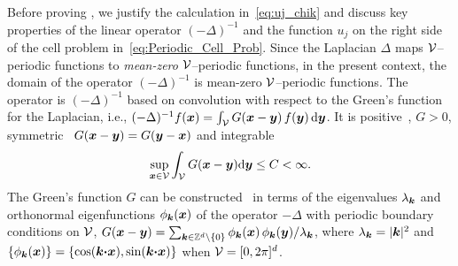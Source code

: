 \documentclass[amsa]{ipart}
\begin{document}
Before proving , we justify the calculation 
in~\eqref{eq:uj_chik} and discuss key properties of the
linear operator $(-\Delta)^{-1}$ and the function $u_j$ on the right side
of the cell problem in~\eqref{eq:Periodic_Cell_Prob}. Since the
Laplacian $\Delta$ maps $\mathcal{V}$--periodic functions to \emph{mean-zero}
$\mathcal{V}$--periodic functions, in the present context, the domain of the
operator $(-\Delta)^{-1}$ is mean-zero $\mathcal{V}$--periodic functions. The
operator is $(-\Delta)^{-1}$ based on convolution with respect to the
Green's function for the Laplacian, i.e.,
$(-\Delta)^{-1}f(\boldsymbol{x})=\int_{\mathcal{V}}G(\boldsymbol{x}-\boldsymbol{y})\,f(\boldsymbol{y})\,\mathrm{d}\boldsymbol{y}$. It is
positive~\cite{Stakgold:BVP:2000}, $G>0$,
symmetric~\cite{Folland:95:PDEs,Stakgold:BVP:2000}  
$G(\boldsymbol{x}-\boldsymbol{y})=G(\boldsymbol{y}-\boldsymbol{x})$
and integrable~\cite{Melnikov:2012:Green,Melnikov2006774,McCann08042001}
%
\begin{align}\label{eq:Integrable_G}
 \sup_{\vecx\in\Vc} \int_{\Vc}G(\vecx-\vecy)\d\vecy\leq C<\infty.
\end{align}
%
The Green's function $G$ can be constructed~\cite{Melnikov:2012:Green}
in terms of the eigenvalues $\lambda_{\boldsymbol{k}}$ and orthonormal eigenfunctions
$\phi_{\boldsymbol{k}}(\boldsymbol{x})$ of the operator $-\Delta$ with periodic boundary
conditions on $\mathcal{V}$, $G(\boldsymbol{x}-\boldsymbol{y})=\sum_{\boldsymbol{k}\in\mathbb{Z}^d\backslash\{0\}}
\phi_{\boldsymbol{k}}(\boldsymbol{x})\,\phi_{\boldsymbol{k}}(\boldsymbol{y})/\lambda_{\boldsymbol{k}}$,   
where $\lambda_{\boldsymbol{k}}=|\boldsymbol{k}|^2$ and
$\{\phi_{\boldsymbol{k}}(\boldsymbol{x})\}=\{\cos(\boldsymbol{k}\mbox{\boldmath${\cdot}$}\boldsymbol{x}),\sin(\boldsymbol{k}\mbox{\boldmath${\cdot}$}\boldsymbol{x})\}$
when $\mathcal{V}=[0,2\pi]^d$.
\end{document}
